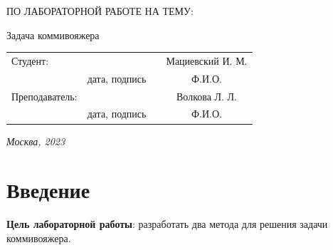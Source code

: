 \documentclass[12pt, a4paper]{article}
\begin{document}
\begin{titlepage}
\begin{center}
\begin{bf}
    \fontsize{20}{30}\selectfont
    ПО ЛАБОРАТОРНОЙ РАБОТЕ НА ТЕМУ:

    Задача коммивояжера

   \end{bf}
  \end{center}

  \fontsize{14}{21}\selectfont
  \vspace{5cm}


  \noindent\begin{tabularx}{\textwidth}{ X >{\centering}p{4cm} p{1cm} c }
   Студент: & & & Мациевский И. М. \\ \cline{2-2} \cline{4-4}
   & \fontsize{10}{15}\selectfont дата, подпись & & \fontsize{10}{15}\selectfont Ф.И.О. \\
   Преподаватель: & & & Волкова Л. Л.\\ \cline{2-2} \cline{4-4}
   & \fontsize{10}{15}\selectfont дата, подпись & & \fontsize{10}{15}\selectfont Ф.И.О.
   \end{tabularx}

  \vspace{\fill}

  \begin{center}
   \it{Москва}, 2023
  \end{center}

  \thispagestyle{empty}
\end{titlepage}\newpage
\tableofcontents
\newpage
\section*{Введение}
\justifying
\textbf{Цель лабораторной работы}: разработать 
два метода для решения задачи коммивояжера.
\end{document}
